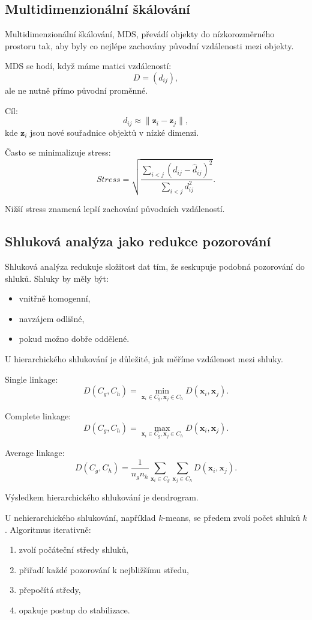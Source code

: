 \subsection{Multidimenzionální škálování}

Multidimenzionální škálování, MDS, převádí objekty do nízkorozměrného prostoru tak, aby byly co nejlépe
zachovány původní vzdálenosti mezi objekty.

MDS se hodí, když máme matici vzdáleností:
\[
D=(d_{ij}),
\]
ale ne nutně přímo původní proměnné.

Cíl:
\[
d_{ij}
\approx
\|\mathbf{z}_i-\mathbf{z}_j\|,
\]
kde $\mathbf{z}_i$ jsou nové souřadnice objektů v nízké dimenzi.

Často se minimalizuje stress:
\[
Stress
=
\sqrt{
\frac{
\sum_{i<j}(d_{ij}-\hat d_{ij})^2
}{
\sum_{i<j}d_{ij}^2
}
}.
\]

Nižší stress znamená lepší zachování původních vzdáleností.

\subsection{Shluková analýza jako redukce pozorování}

Shluková analýza redukuje složitost dat tím, že seskupuje podobná pozorování do shluků.
Shluky by měly být:
\begin{itemize}
    \item vnitřně homogenní,
    \item navzájem odlišné,
    \item pokud možno dobře oddělené.
\end{itemize}

U hierarchického shlukování je důležité, jak měříme vzdálenost mezi shluky.

Single linkage:
\[
D(C_g,C_h)
=
\min_{\mathbf{x}_i\in C_g,\mathbf{x}_j\in C_h}
D(\mathbf{x}_i,\mathbf{x}_j).
\]

Complete linkage:
\[
D(C_g,C_h)
=
\max_{\mathbf{x}_i\in C_g,\mathbf{x}_j\in C_h}
D(\mathbf{x}_i,\mathbf{x}_j).
\]

Average linkage:
\[
D(C_g,C_h)
=
\frac{1}{n_g n_h}
\sum_{\mathbf{x}_i\in C_g}
\sum_{\mathbf{x}_j\in C_h}
D(\mathbf{x}_i,\mathbf{x}_j).
\]

Výsledkem hierarchického shlukování je dendrogram.

U nehierarchického shlukování, například $k$-means, se předem zvolí počet shluků $k$.
Algoritmus iterativně:
\begin{enumerate}
    \item zvolí počáteční středy shluků,
    \item přiřadí každé pozorování k nejbližšímu středu,
    \item přepočítá středy,
    \item opakuje postup do stabilizace.
\end{enumerate}

